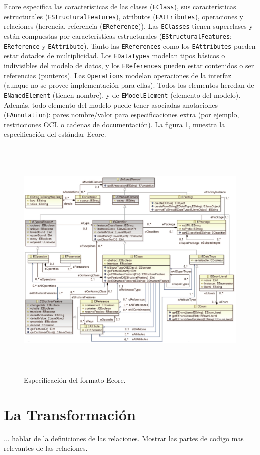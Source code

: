 Ecore especifica las características de las clases (\texttt{EClass}), sus características estructurales (\texttt{EStructuralFeatures}), atributos (\texttt{EAttributes}), operaciones y relaciones (herencia, referencia (\texttt{EReference})). Las \texttt{EClasses} tienen superclases y están compuestas por características estructurales (\texttt{EStructuralFeatures}: \texttt{EReference} y \texttt{EAttribu\-te}). Tanto las \texttt{EReferences} como los \texttt{EAttributes} pueden estar dotados de multipli\-cidad.
Los \texttt{EDataTypes} modelan tipos básicos o indivisibles del modelo de datos, y los \texttt{EReferences} pueden estar contenidos o ser referencias (punteros).
Las \texttt{Operations} modelan operaciones de la interfaz (aunque no se provee implementación para ellas).
Todos los elementos heredan de \texttt{ENamedElement} (tienen nombre), y de \texttt{EModelElement} (elemento del modelo). Además, todo elemento del modelo puede te\-ner asociadas anotaciones (\texttt{EAnnotation}): pares nombre/valor para especificaciones extra (por ejemplo, restricciones OCL o cadenas de documentación). La figura \ref{fig:ECORE}, muestra la especificación del estándar Ecore.

\begin{figure}[H] 
\begin{center}
 \includegraphics [width=135mm, height=120mm]{imagenes/ecore.eps}
\end{center}
\caption{Especificación del formato Ecore.}
\label{fig:ECORE}
\end{figure} 


\section{La Transformación}
\label{La Transformacion}

... hablar de la definiciones de las relaciones. Mostrar las partes de codigo mas relevantes de las relaciones.

